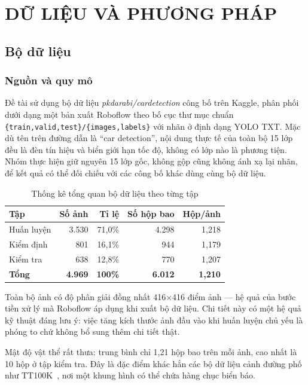 \chapter{DỮ LIỆU VÀ PHƯƠNG PHÁP}
\label{ch:phuong_phap}

\section{Bộ dữ liệu}

\subsection{Nguồn và quy mô}

Đề tài sử dụng bộ dữ liệu \textit{pkdarabi/cardetection} công bố trên Kaggle, phân phối dưới dạng
một bản xuất Roboflow theo bố cục thư mục chuẩn \texttt{\{train,valid,test\}/\{images,labels\}} với
nhãn ở định dạng YOLO TXT. Mặc dù tên trên đường dẫn là ``car detection'', nội dung thực tế của
toàn bộ 15 lớp đều là đèn tín hiệu và biển giới hạn tốc độ, không có lớp nào là phương tiện. Nhóm
thực hiện giữ nguyên 15 lớp gốc, không gộp cũng không ánh xạ lại nhãn, để kết quả có thể đối chiếu
với các công bố khác dùng cùng bộ dữ liệu.

\begin{table}[H]
\centering
\caption{Thống kê tổng quan bộ dữ liệu theo từng tập}
\label{tab:dataset_summary}
\small
\begin{tabular}{lrrrr}
\toprule
\textbf{Tập} & \textbf{Số ảnh} & \textbf{Tỉ lệ} & \textbf{Số hộp bao} & \textbf{Hộp/ảnh} \\
\midrule
Huấn luyện & 3.530 & 71,0\% & 4.298 & 1,218 \\
Kiểm định  & 801   & 16,1\% & 944   & 1,179 \\
Kiểm tra   & 638   & 12,8\% & 770   & 1,207 \\
\midrule
\textbf{Tổng} & \textbf{4.969} & \textbf{100\%} & \textbf{6.012} & \textbf{1,210} \\
\bottomrule
\end{tabular}
\end{table}

Toàn bộ ảnh có độ phân giải đồng nhất 416$\times$416 điểm ảnh --- hệ quả của bước tiền xử lý mà
Roboflow áp dụng khi xuất bộ dữ liệu. Chi tiết này có một hệ quả kỹ thuật đáng lưu ý: việc tăng
kích thước ảnh đầu vào khi huấn luyện chủ yếu là phóng to chứ không bổ sung thêm chi tiết thật.

Mật độ vật thể rất thưa: trung bình chỉ 1,21 hộp bao trên mỗi ảnh, cao nhất là 10 hộp ở tập kiểm
tra. Đây là đặc điểm khác hẳn các bộ dữ liệu cảnh đường phố như TT100K~\cite{zhu2016tt100k}, nơi
một khung hình có thể chứa hàng chục biển báo.

